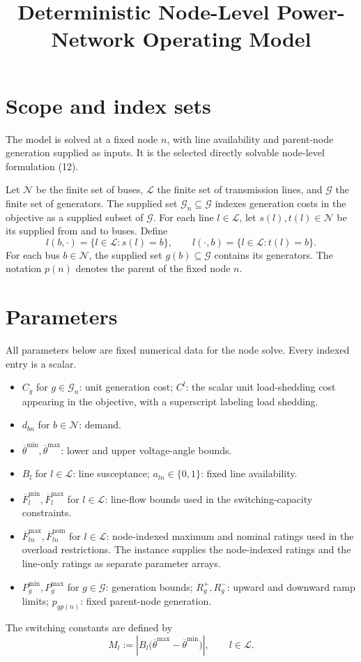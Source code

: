 \documentclass{article}
\title{Deterministic Node-Level Power-Network Operating Model}
\author{}
\date{}
\begin{document}
\maketitle

\section*{Scope and index sets}
The model is solved at a fixed node $n$, with line availability and parent-node generation supplied as inputs. It is the selected directly solvable node-level formulation (12).

Let $\mathcal N$ be the finite set of buses, $\mathcal L$ the finite set of transmission lines, and $\mathcal G$ the finite set of generators. The supplied set $\mathcal G_n\subseteq\mathcal G$ indexes generation costs in the objective as a supplied subset of $\mathcal G$. For each line $l\in\mathcal L$, let $s(l),t(l)\in\mathcal N$ be its supplied from and to buses. Define
\[
 l(b,\cdot)=\{l\in\mathcal L:s(l)=b\},\qquad
 l(\cdot,b)=\{l\in\mathcal L:t(l)=b\}.
\]
For each bus $b\in\mathcal N$, the supplied set $g(b)\subseteq\mathcal G$ contains its generators. The notation $p(n)$ denotes the parent of the fixed node $n$.

\section*{Parameters}
All parameters below are fixed numerical data for the node solve. Every indexed entry is a scalar.
\begin{itemize}
\item $C_g$ for $g\in\mathcal G_n$: unit generation cost; $C^l$: the scalar unit load-shedding cost appearing in the objective, with a superscript labeling load shedding.
\item $d_{bn}$ for $b\in\mathcal N$: demand.
\item $\overline\theta^{\min},\overline\theta^{\max}$: lower and upper voltage-angle bounds.
\item $B_l$ for $l\in\mathcal L$: line susceptance; $a_{ln}\in\{0,1\}$: fixed line availability.
\item $\overline F_l^{\min},\overline F_l^{\max}$ for $l\in\mathcal L$: line-flow bounds used in the switching-capacity constraints.
\item $\overline F_{ln}^{\max},\overline F_{ln}^{\mathrm{nom}}$ for $l\in\mathcal L$: node-indexed maximum and nominal ratings used in the overload restrictions. The instance supplies the node-indexed ratings and the line-only ratings as separate parameter arrays.
\item $P_g^{\min},P_g^{\max}$ for $g\in\mathcal G$: generation bounds; $R_g^+,R_g^-$: upward and downward ramp limits; $p_{g p(n)}$: fixed parent-node generation.
\end{itemize}
The switching constants are defined by
\[
M_l:=\left|B_l\bigl(\overline\theta^{\max}-\overline\theta^{\min}\bigr)\right|,
\qquad l\in\mathcal L.
\]
\end{document}
